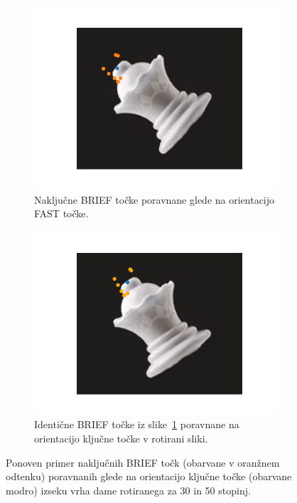 \documentclass[a4paper,11pt]{article}
\begin{document}
\begin{figure}[h!b]
	\centering
	\begin{subfigure}[t]{0.48\textwidth}
		\centering
		\includegraphics[width=\textwidth]{images/brief_orientation1_0.png}
		\caption{Naključne BRIEF točke poravnane glede na orientacijo FAST točke.}
		\label{img:brief_orientation1_0}
	\end{subfigure}
	\hfill
	\begin{subfigure}[t]{0.48\textwidth}
		\centering
		\includegraphics[width=\textwidth]{images/brief_orientation1_1.png}
		\caption{Identične BRIEF točke iz slike~\ref{img:brief_orientation1_0} poravnane na orientacijo ključne točke v rotirani sliki.}
		\label{img:brief_orientation1_1}
	\end{subfigure}
	\caption{Ponoven primer naključnih BRIEF točk (obarvane v oranžnem odtenku) poravnanih glede na orientacijo ključne točke (obarvane modro) izseku vrha dame rotiranega za 30 in 50 stopinj.}
	\label{img:brief_orientation1}
\end{figure}
\end{document}
